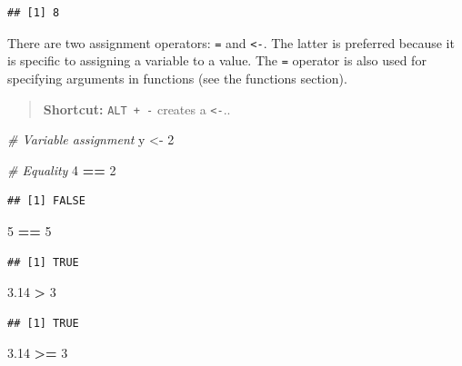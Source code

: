 \documentclass[openany]{book}
\newenvironment{Shaded}{\begin{snugshade}}{\end{snugshade}}
\newcommand{\CommentTok}[1]{\textcolor[rgb]{0.56,0.35,0.01}{\textit{#1}}}
\newcommand{\DecValTok}[1]{\textcolor[rgb]{0.00,0.00,0.81}{#1}}
\newcommand{\FloatTok}[1]{\textcolor[rgb]{0.00,0.00,0.81}{#1}}
\newcommand{\NormalTok}[1]{#1}
\newcommand{\OperatorTok}[1]{\textcolor[rgb]{0.81,0.36,0.00}{\textbf{#1}}}
\newcommand{\StringTok}[1]{\textcolor[rgb]{0.31,0.60,0.02}{#1}}
\begin{document}
\begin{verbatim}
## [1] 8
\end{verbatim}

There are two assignment operators: \texttt{=} and \texttt{\textless{}-}. The latter is preferred because
it is specific to assigning a variable to a value. The \texttt{=} operator is also used
for specifying arguments in functions (see the functions section).

\begin{quote}
\textbf{Shortcut:} \texttt{ALT\ +\ -} creates a \texttt{\textless{}-}..
\end{quote}

\begin{Shaded}
\begin{Highlighting}[]
\CommentTok{# Variable assignment}
\NormalTok{y <-}\StringTok{ }\DecValTok{2}

\CommentTok{# Equality}
\DecValTok{4} \OperatorTok{==}\StringTok{ }\DecValTok{2}
\end{Highlighting}
\end{Shaded}

\begin{verbatim}
## [1] FALSE
\end{verbatim}

\begin{Shaded}
\begin{Highlighting}[]
\DecValTok{5} \OperatorTok{==}\StringTok{ }\DecValTok{5}
\end{Highlighting}
\end{Shaded}

\begin{verbatim}
## [1] TRUE
\end{verbatim}

\begin{Shaded}
\begin{Highlighting}[]
\FloatTok{3.14} \OperatorTok{>}\StringTok{ }\DecValTok{3}
\end{Highlighting}
\end{Shaded}

\begin{verbatim}
## [1] TRUE
\end{verbatim}

\begin{Shaded}
\begin{Highlighting}[]
\FloatTok{3.14} \OperatorTok{>=}\StringTok{ }\DecValTok{3}
\end{Highlighting}
\end{Shaded}
\end{document}

